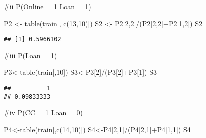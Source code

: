 \documentclass[
]{article}
\newenvironment{Shaded}{\begin{snugshade}}{\end{snugshade}}
\newcommand{\DecValTok}[1]{\textcolor[rgb]{0.00,0.00,0.81}{#1}}
\newcommand{\FunctionTok}[1]{\textcolor[rgb]{0.00,0.00,0.00}{#1}}
\newcommand{\NormalTok}[1]{#1}
\newcommand{\OtherTok}[1]{\textcolor[rgb]{0.56,0.35,0.01}{#1}}
\newcommand{\SpecialCharTok}[1]{\textcolor[rgb]{0.00,0.00,0.00}{#1}}
\begin{document}
\#ii P(Online = 1 \textbar{} Loan = 1)

\begin{Shaded}
\begin{Highlighting}[]
\NormalTok{P2 }\OtherTok{\textless{}{-}} \FunctionTok{table}\NormalTok{(train[, }\FunctionTok{c}\NormalTok{(}\DecValTok{13}\NormalTok{,}\DecValTok{10}\NormalTok{)])}
\NormalTok{S2 }\OtherTok{\textless{}{-}}\NormalTok{ P2[}\DecValTok{2}\NormalTok{,}\DecValTok{2}\NormalTok{]}\SpecialCharTok{/}\NormalTok{(P2[}\DecValTok{2}\NormalTok{,}\DecValTok{2}\NormalTok{]}\SpecialCharTok{+}\NormalTok{P2[}\DecValTok{1}\NormalTok{,}\DecValTok{2}\NormalTok{])}
\NormalTok{S2}
\end{Highlighting}
\end{Shaded}

\begin{verbatim}
## [1] 0.5966102
\end{verbatim}

\#iii P(Loan = 1)

\begin{Shaded}
\begin{Highlighting}[]
\NormalTok{P3}\OtherTok{\textless{}{-}}\FunctionTok{table}\NormalTok{(train[,}\DecValTok{10}\NormalTok{])}
\NormalTok{S3}\OtherTok{\textless{}{-}}\NormalTok{P3[}\DecValTok{2}\NormalTok{]}\SpecialCharTok{/}\NormalTok{(P3[}\DecValTok{2}\NormalTok{]}\SpecialCharTok{+}\NormalTok{P3[}\DecValTok{1}\NormalTok{])}
\NormalTok{S3}
\end{Highlighting}
\end{Shaded}

\begin{verbatim}
##          1 
## 0.09833333
\end{verbatim}

\#iv P(CC = 1 \textbar{} Loan = 0)

\begin{Shaded}
\begin{Highlighting}[]
\NormalTok{P4}\OtherTok{\textless{}{-}}\FunctionTok{table}\NormalTok{(train[,}\FunctionTok{c}\NormalTok{(}\DecValTok{14}\NormalTok{,}\DecValTok{10}\NormalTok{)])}
\NormalTok{S4}\OtherTok{\textless{}{-}}\NormalTok{P4[}\DecValTok{2}\NormalTok{,}\DecValTok{1}\NormalTok{]}\SpecialCharTok{/}\NormalTok{(P4[}\DecValTok{2}\NormalTok{,}\DecValTok{1}\NormalTok{]}\SpecialCharTok{+}\NormalTok{P4[}\DecValTok{1}\NormalTok{,}\DecValTok{1}\NormalTok{])}
\NormalTok{S4}
\end{Highlighting}
\end{Shaded}
\end{document}
